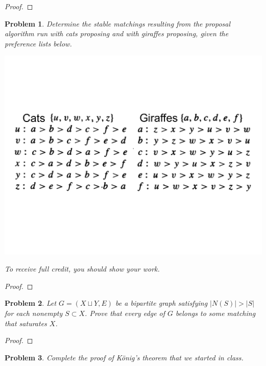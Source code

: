 \documentclass[11pt]{article}
\newtheorem{problem}{Problem}
\begin{document}
\begin{proof}

\end{proof}

\pagebreak



\begin{problem}
Determine the stable matchings resulting from the proposal algorithm run with cats proposing and with giraffes proposing, given the preference lists below.
\begin{center}
\includegraphics[scale=.5]{stable-match.pdf}
\end{center}
To receive full credit, you should show your work.
\end{problem}

\begin{proof}

\end{proof}

\pagebreak

\begin{problem}
Let $G=(X\sqcup Y,E)$ be a bipartite graph satisfying $|N(S)|>|S|$ for each nonempty $S\subset X$. Prove that every edge of $G$ belongs to some matching that saturates $X$. 
\end{problem}

\begin{proof}

\end{proof}

\pagebreak 

\begin{problem}
Complete the proof of K\"onig's theorem that we started in class. 
\end{problem}
\end{document}
